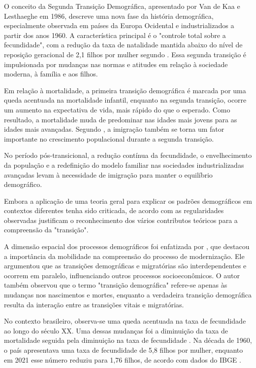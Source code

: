 O conceito da Segunda Transição Demográfica, apresentado por Van de Kaa e Lesthaeghe em 1986, descreve uma nova fase da história demográfica, especialmente observada em países da Europa Ocidental e industrializados a partir dos anos 1960. A característica principal é o "controle total sobre a fecundidade", com a redução da taxa de natalidade mantida abaixo do nível de reposição geracional de 2,1 filhos por mulher segundo . Essa segunda transição é impulsionada por mudanças nas normas e atitudes em relação à sociedade moderna, à família e aos filhos.

Em relação à mortalidade, a primeira transição demográfica é marcada por uma queda acentuada na mortalidade infantil, enquanto na segunda transição, ocorre um aumento na expectativa de vida, mais rápido do que o esperado. Como resultado, a mortalidade muda de predominar nas idades mais jovens para as idades mais avançadas. Segundo \cite{vandekaa2002}, a imigração também se torna um fator importante no crescimento populacional durante a segunda transição.

No período pós-transicional, a redução contínua da fecundidade, o envelhecimento da população e a redefinição do modelo familiar nas sociedades industrializadas avançadas levam à necessidade de imigração para manter o equilíbrio demográfico.

Embora a aplicação de uma teoria geral para explicar os padrões demográficos em contextos diferentes tenha sido criticada, de acordo com  as regularidades observadas justificam o reconhecimento dos vários contributos teóricos para a compreensão da "transição".

A dimensão espacial dos processos demográficos foi enfatizada por , que destacou a importância da mobilidade na compreensão do processo de modernização. Ele argumentou que as transições demográficas e migratórias são interdependentes e ocorrem em paralelo, influenciando outros processos socioeconômicos. O autor também observou que o termo "transição demográfica" refere-se apenas às mudanças nos nascimentos e mortes, enquanto a verdadeira transição demográfica resulta da interação entre as transições vitais e migratórias.

No contexto brasileiro, observa-se uma queda acentuada na taxa de fecundidade ao longo do século XX. Uma dessas mudanças foi a diminuição da taxa de mortalidade seguida pela diminuição na taxa de fecundidade \cite{beltrao_dinamica_2004}. Na década de 1960, o país apresentava uma taxa de fecundidade de 5,8 filhos por mulher, enquanto em 2021 esse número reduziu para 1,76 filhos, de acordo com dados do IBGE \cite{noauthor_ibge_nodate}.


